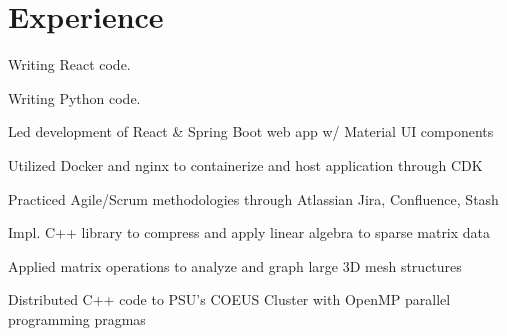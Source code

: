 \documentclass[letterpaper]{deedy-resume} %
\begin{document}
\begin{minipage}[t]{0.66\textwidth} %

\section{Experience}

\vspace{\topsep} %
\begin{tightitemize}
\item Writing React code.
\end{tightitemize}

\sectionspace %

\begin{tightitemize}
\item Writing Python code.
\end{tightitemize}

\sectionspace %

\begin{tightitemize}
  \item Led development of React \& Spring Boot web app w/ Material UI components
  \item Utilized Docker and nginx to containerize and host application through CDK
  \item Practiced Agile/Scrum methodologies through Atlassian Jira, Confluence, Stash
\end{tightitemize}

\sectionspace %

\begin{tightitemize}
  \item Impl. C++ library to compress and apply linear algebra to sparse matrix data
  \item Applied matrix operations to analyze and graph large 3D mesh structures
  \item Distributed C++ code to PSU's COEUS Cluster with OpenMP parallel programming pragmas
\end{tightitemize}


\end{minipage}
\end{document}
